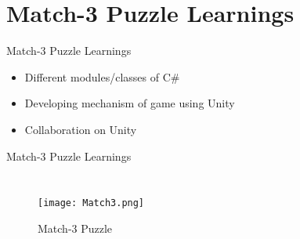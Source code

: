 \documentclass[10pt]{beamer}
\begin{document}
\section{Match-3 Puzzle Learnings}
    \begin{frame}{Match-3 Puzzle Learnings}
     \begin{itemize}
        \item Different modules/classes of C\#
        \item Developing mechanism of game using Unity
        \item Collaboration on Unity
      \end{itemize}  
    \end{frame}
    \begin{frame}{Match-3 Puzzle Learnings}
         \begin{columns}
        \begin{figure}
        \texttt{[image: Match3.png]}
        \caption{Match-3 Puzzle}
        \end{figure}
        \end{columns}
    \end{frame}
    
\end{document}
